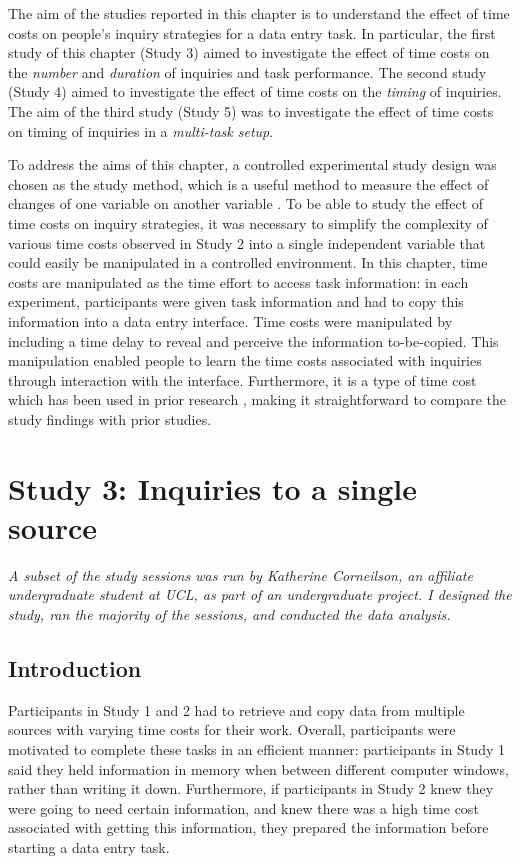 The aim of the studies reported in this chapter is to understand the effect of time costs on people's inquiry strategies for a data entry task. In particular, the first study of this chapter (Study 3) aimed to investigate the effect of time costs on the \textit{number} and \textit{duration} of inquiries and task performance. The second study (Study 4) aimed to investigate the effect of time costs on the \textit{timing} of inquiries. The aim of the third study (Study 5) was to investigate the effect of time costs on timing of inquiries in a \textit{multi-task setup}.

To address the aims of this chapter, a controlled experimental study design was chosen as the study method, which is a useful method to measure the effect of changes of one variable on another variable \citep{Cairns2008}. To be able to study the effect of time costs on inquiry strategies, it was necessary to simplify the complexity of various time costs observed in Study 2 into a single independent variable that could easily be manipulated in a controlled environment. In this chapter, time costs are manipulated as the time effort to access task information: in each experiment, participants were given task information and had to copy this information into a data entry interface. Time costs were manipulated by including a time delay to reveal and perceive the information to-be-copied. This manipulation enabled people to learn the time costs associated with inquiries through interaction with the interface. Furthermore, it is a type of time cost which has been used in prior research \citep[e.g.][]{Gray2006, Morgan2009}, making it straightforward to compare the study findings with prior studies.

\section{Study 3: Inquiries to a single source}\label{ch:Study3}

\textit{A subset of the study sessions was run by Katherine Corneilson, an affiliate undergraduate student at UCL, as part of an undergraduate project. I designed the study, ran the majority of the sessions, and conducted the data analysis.}

\subsection{Introduction}
Participants in Study 1 and 2 had to retrieve and copy data from multiple sources with varying time costs for their work. Overall, participants were motivated to complete these tasks in an efficient manner: participants in Study 1 said they held information in memory when between different computer windows, rather than writing it down. Furthermore, if participants in Study 2 knew they were going to need certain information, and knew there was a high time cost associated with getting this information, they prepared the information before starting a data entry task. 

